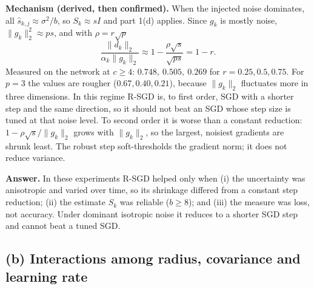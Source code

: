 \documentclass[11pt,a4paper]{article}
\newcommand{\norm}[1]{\lVert #1\rVert_2}
\begin{document}
\textbf{Mechanism (derived, then confirmed).} When the injected noise dominates, all
$\widehat s_{k,j}\approx\sigma^2/b$, so $S_k\approx sI$ and part 1(d) applies. Since $g_k$ is
mostly noise, $\norm{g_k}^2\approx ps$, and with $\rho=r\sqrt p$
\begin{equation*}
\frac{\norm{d_k}}{\alpha_k\norm{g_k}}\approx1-\frac{\rho\sqrt s}{\sqrt{ps}}=1-r .
\end{equation*}
Measured on the network at $c\ge4$: $0.748,\ 0.505,\ 0.269$ for $r=0.25,0.5,0.75$. For $p=3$ the
values are rougher ($0.67, 0.40, 0.21$), because $\norm{g_k}$ fluctuates more in three dimensions.
In this regime R-SGD is, to first order, SGD with a shorter step and the same direction, so it
should not beat an SGD whose step size is tuned at that noise level. To second order it is worse
than a constant reduction: $1-\rho\sqrt s/\norm{g_k}$ grows with $\norm{g_k}$, so the largest,
noisiest gradients are shrunk least. The robust step soft-thresholds the gradient norm; it does not
reduce variance.

\textbf{Answer.} In these experiments R-SGD helped only when (i) the uncertainty was anisotropic
and varied over time, so its shrinkage differed from a constant step reduction; (ii) the estimate
$S_k$ was reliable ($b\ge8$); and (iii) the measure was loss, not accuracy. Under dominant
isotropic noise it reduces to a shorter SGD step and cannot beat a tuned SGD.

\subsection{(b) Interactions among radius, covariance and learning rate}
\end{document}
